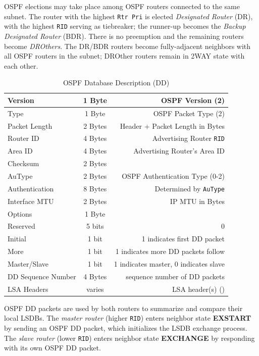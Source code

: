 \documentclass[12pt]{article}
\begin{document}
	OSPF elections may take place among OSPF routers connected to the same subnet. The router with the highest \texttt{Rtr Pri} is elected \textit{Designated Router} (DR), with the highest \texttt{RID} serving as tiebreaker; the runner-up becomes the \textit{Backup Designated Router} (BDR). There is no preemption and the remaining routers become \textit{DROthers}. The DR/BDR routers become fully-adjacent neighbors with all OSPF routers in the subnet; DROther routers remain in 2WAY state with each other.

	\begin{table}[H]
	\centering
	\caption{OSPF Database Description (DD) \label{tab:OSPF DD}}
	\begin{tabular}{| l | c | r |}
	\hline
	Version			& 1 Byte	& OSPF Version (2)\\\hline
	Type				& 1 Byte	& OSPF Packet Type (2)\\\hline
	Packet Length		& 2 Bytes	& Header + Packet Length in Bytes\\\hline
	Router ID			& 4 Bytes	& Advertising Router \texttt{RID}\\\hline
	Area ID			& 4 Bytes	& Advertising Router's Area ID\\\hline
	Checksum			& 2 Bytes	&\\\hline
	AuType			& 2 Bytes	& OSPF Authentication Type (0-2)\\\hline
	Authentication		& 8 Bytes	& Determined by \texttt{AuType}\\\hline
	Interface MTU		& 2 Bytes	& IP MTU in Bytes\\\hline
	Options			& 1 Byte	&\\\hline
	Reserved			& 5 bits	& 0\\\hline
	Initial				& 1 bit 	& 1 indicates first DD packet\\\hline 
	More				& 1 bit 	& 1 indicates more DD packets follow\\\hline
	Master/Slave		& 1 bit 	& 1 indicates master, 0 indicates slave\\\hline
	DD Sequence Number	& 4 Bytes	& sequence number of DD packets\\\hline
	LSA Headers		& varies	& LSA header(s) (\Cref{tab:OSPF LSA})\\\hline
	\end{tabular}\end{table}
	OSPF DD packets are used by both routers to summarize and compare their local LSDBs. The \textit{master router} (higher \texttt{RID}) enters neighbor state \textbf{EXSTART} by sending an OSPF DD packet, which initializes the LSDB exchange process. The \textit{slave router} (lower \texttt{RID}) enters neighbor state \textbf{EXCHANGE} by responding with its own OSPF DD packet.
\end{document}
